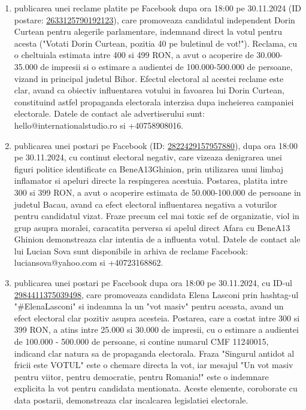 \documentclass[a4paper,12pt]{article}
\begin{document}
\begin{enumerate}[leftmargin=*, label=\arabic*.)]
    \item publicarea unei reclame platite pe Facebook dupa ora 18:00 pe 30.11.2024 (ID postare: \href{https://www.facebook.com/ads/library/?id=2633125790192123}{2633125790192123}), care promoveaza candidatul independent Dorin Curtean pentru alegerile parlamentare, indemnand direct la votul pentru acesta ("Votati Dorin Curtean, pozitia 40 pe buletinul de vot!").  Reclama, cu o cheltuiala estimata intre 400 si 499 RON, a avut o acoperire de 30.000-35.000 de impresii si o estimare a audientei de 100.000-500.000 de persoane, vizand in principal judetul Bihor.  Efectul electoral al acestei reclame este clar, avand ca obiectiv influentarea votului in favoarea lui Dorin Curtean, constituind astfel propaganda electorala interzisa dupa incheierea campaniei electorale.  Datele de contact ale advertiserului sunt: hello@internationalstudio.ro si +40758908016.
    \item publicarea unei postari pe Facebook (ID: \href{https://www.facebook.com/ads/library/?id=2822429157957880}{2822429157957880}), dupa ora 18:00 pe 30.11.2024, cu continut electoral negativ, care vizeaza denigrarea unei figuri politice identificate ca BeneA13Ghinion, prin utilizarea unui limbaj inflamator si apeluri directe la respingerea acestuia. Postarea, platita intre 300 si 399 RON, a avut o acoperire estimata de 50.000-100.000 de persoane in judetul Bacau, avand ca efect electoral influentarea negativa a voturilor pentru candidatul vizat.  Fraze precum cel mai toxic sef de organizatie, viol in grup asupra moralei, caracatita perversa si apelul direct Afara cu BeneA13 Ghinion demonstreaza clar intentia de a influenta votul.  Datele de contact ale lui Lucian Sova sunt disponibile in arhiva de reclame Facebook: luciansova@yahoo.com si +40723168862.
    \item publicarea unei postari pe Facebook dupa ora 18:00 pe 30.11.2024, cu ID-ul \href{https://www.facebook.com/ads/library/?id=2984411375039498}{2984411375039498}, care promoveaza candidata Elena Lasconi prin hashtag-ul "\#ElenaLasconi" si indeamna la un "vot masiv" pentru aceasta, avand un efect electoral clar pozitiv asupra acesteia. Postarea, care a costat intre 300 si 399 RON, a atins intre 25.000 si 30.000 de impresii, cu o estimare a audientei de 100.000 - 500.000 de persoane, si contine numarul CMF 11240015, indicand clar natura sa de propaganda electorala.  Fraza "Singurul antidot al fricii este VOTUL" este o chemare directa la vot, iar mesajul "Un vot masiv pentru viitor, pentru democratie, pentru Romania!" este o indemnare explicita la vot pentru candidata mentionata.  Aceste elemente, coroborate cu data postarii, demonstreaza clar incalcarea legislatiei electorale.

\end{enumerate}
\end{document}
